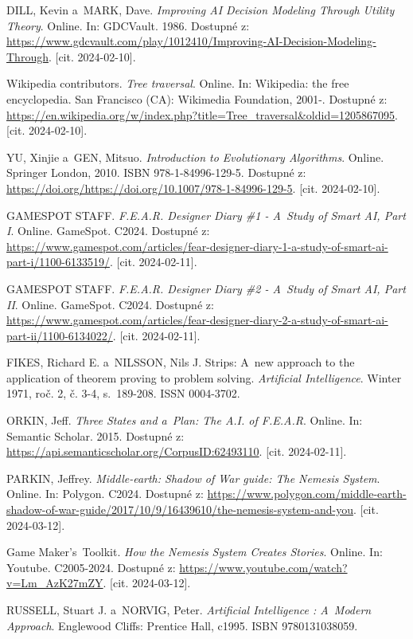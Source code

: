 DILL, Kevin a~MARK, Dave. \textit{Improving AI Decision Modeling Through Utility Theory}. Online. In: GDCVault. 1986. Dostupné z: \url{https://www.gdcvault.com/play/1012410/Improving-AI-Decision-Modeling-Through}. [cit. 2024-02-10].

Wikipedia contributors. \textit{Tree traversal}. Online. In: Wikipedia: the free encyclopedia. San Francisco (CA): Wikimedia Foundation, 2001-. Dostupné z: \url{https://en.wikipedia.org/w/index.php?title=Tree_traversal&oldid=1205867095}. [cit. 2024-02-10].

YU, Xinjie a~GEN, Mitsuo. \textit{Introduction to Evolutionary Algorithms}. Online. Springer London, 2010. ISBN 978-1-84996-129-5. Dostupné z: \url{https://doi.org/https://doi.org/10.1007/978-1-84996-129-5}. [cit. 2024-02-10].

GAMESPOT STAFF. \textit{F.E.A.R. Designer Diary \#1 - A~Study of Smart AI, Part I}. Online. GameSpot. C2024. Dostupné z: \url{https://www.gamespot.com/articles/fear-designer-diary-1-a-study-of-smart-ai-part-i/1100-6133519/}. [cit. 2024-02-11].

GAMESPOT STAFF. \textit{F.E.A.R. Designer Diary \#2 - A~Study of Smart AI, Part II}. Online. GameSpot. C2024. Dostupné z: \url{https://www.gamespot.com/articles/fear-designer-diary-2-a-study-of-smart-ai-part-ii/1100-6134022/}. [cit. 2024-02-11].

FIKES, Richard E. a~NILSSON, Nils J. Strips: A~new approach to the application of theorem proving to problem solving. \textit{Artificial Intelligence}. Winter 1971, roč. 2, č. 3-4, s.~189-208. ISSN 0004-3702.

ORKIN, Jeff. \textit{Three States and a~Plan: The A.I. of F.E.A.R}. Online. In: Semantic Scholar. 2015. Dostupné z: \url{https://api.semanticscholar.org/CorpusID:62493110}. [cit. 2024-02-11].

PARKIN, Jeffrey. \textit{Middle-earth: Shadow of War guide: The Nemesis System}. Online. In: Polygon. C2024. Dostupné z: \url{https://www.polygon.com/middle-earth-shadow-of-war-guide/2017/10/9/16439610/the-nemesis-system-and-you}. [cit. 2024-03-12].

Game Maker's~Toolkit. \textit{How the Nemesis System Creates Stories}. Online. In: Youtube. C2005-2024. Dostupné z: \url{https://www.youtube.com/watch?v=Lm\_AzK27mZY}. [cit. 2024-03-12].

RUSSELL, Stuart J. a~NORVIG, Peter. \textit{Artificial Intelligence : A~Modern Approach}. Englewood Cliffs: Prentice Hall, c1995. ISBN 9780131038059.

